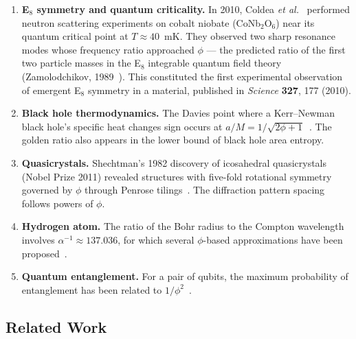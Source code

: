 \documentclass[aps,prd,preprint,superscriptaddress,showpacs,nofootinbib,longbibliography]{revtex4-2}
\begin{document}
\begin{enumerate}[itemsep=2pt]
    \item \textbf{E$_8$ symmetry and quantum criticality.} In 2010, Coldea \emph{et al.}~\cite{coldea2010} performed neutron scattering experiments on cobalt niobate (CoNb$_2$O$_6$) near its quantum critical point at $T \approx 40$~mK. They observed two sharp resonance modes whose frequency ratio approached $\phi$ --- the predicted ratio of the first two particle masses in the E$_8$ integrable quantum field theory (Zamolodchikov, 1989~\cite{zamolodchikov1989}). This constituted the first experimental observation of emergent E$_8$ symmetry in a material, published in \textit{Science} \textbf{327}, 177 (2010).
    
    \item \textbf{Black hole thermodynamics.} The Davies point where a Kerr--Newman black hole's specific heat changes sign occurs at $a/M = 1/\sqrt{2\phi + 1}$~\cite{cruz1994}. The golden ratio also appears in the lower bound of black hole area entropy.
    
    \item \textbf{Quasicrystals.} Shechtman's 1982 discovery of icosahedral quasicrystals~\cite{shechtman1984} (Nobel Prize 2011) revealed structures with five-fold rotational symmetry governed by $\phi$ through Penrose tilings~\cite{penrose1974}. The diffraction pattern spacing follows powers of $\phi$.
    
    \item \textbf{Hydrogen atom.} The ratio of the Bohr radius to the Compton wavelength involves $\alpha^{-1} \approx 137.036$, for which several $\phi$-based approximations have been proposed~\cite{sherbon2014,heyrovska2005}.
    
    \item \textbf{Quantum entanglement.} For a pair of qubits, the maximum probability of entanglement has been related to $1/\phi^2$~\cite{boeyens2014}.
\end{enumerate}

\subsection{Related Work}
\label{sec:related}
\end{document}
